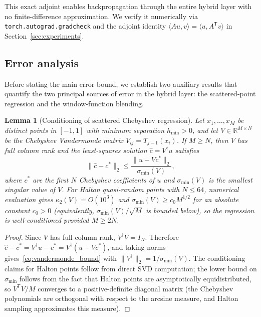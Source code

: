 \documentclass[sn-mathphys,Numbered]{sn-jnl}
\theoremstyle{thmstyleone}
\newtheorem{lemma}[theorem]{Lemma}
\theoremstyle{thmstyletwo}
\theoremstyle{thmstylethree}
\newcommand{\R}{\mathbb{R}}
\newcommand{\T}{\mathsf{T}}
\begin{document}
This exact adjoint enables backpropagation through the entire hybrid layer with no finite-difference approximation. We verify it numerically via \texttt{torch.autograd.gradcheck} and the adjoint identity $\langle A u, v \rangle = \langle u, A^\T v \rangle$ in Section~\ref{sec:experiments}.

\subsection{Error analysis}\label{subsec:error}

Before stating the main error bound, we establish two auxiliary results that quantify the two principal sources of error in the hybrid layer: the scattered-point regression and the window-function blending.

\begin{lemma}[Conditioning of scattered Chebyshev regression]\label{lem:vandermonde}
Let $x_1,\ldots,x_M$ be distinct points in $[-1,1]$ with minimum separation $h_{\min}>0$, and let $V\in\R^{M\times N}$ be the Chebyshev Vandermonde matrix $V_{ij}=T_{j-1}(x_i)$. If $M\geq N$, then $V$ has full column rank and the least-squares solution $\hat{c}=V^\dagger u$ satisfies
\begin{equation}
    \|\hat{c}-c^*\|_2 \leq \frac{\|u-Vc^*\|_2}{\sigma_{\min}(V)},
    \label{eq:vandermonde_bound}
\end{equation}
where $c^*$ are the first $N$ Chebyshev coefficients of $u$ and $\sigma_{\min}(V)$ is the smallest singular value of $V$. For Halton quasi-random points with $N\leq 64$, numerical evaluation gives $\kappa_2(V)=O(10^3)$ and $\sigma_{\min}(V)\geq c_0 M^{1/2}$ for an absolute constant $c_0>0$ (equivalently, $\sigma_{\min}(V)/\sqrt{M}$ is bounded below), so the regression is well-conditioned provided $M\geq 2N$.
\end{lemma}
\begin{proof}
Since $V$ has full column rank, $V^\dagger V=I_N$. Therefore $\hat{c}-c^*=V^\dagger u-c^*=V^\dagger(u-Vc^*)$, and taking norms gives~\eqref{eq:vandermonde_bound} with $\|V^\dagger\|_2=1/\sigma_{\min}(V)$. The conditioning claims for Halton points follow from direct SVD computation; the lower bound on $\sigma_{\min}$ follows from the fact that Halton points are asymptotically equidistributed, so $V^\T V/M$ converges to a positive-definite diagonal matrix (the Chebyshev polynomials are orthogonal with respect to the arcsine measure, and Halton sampling approximates this measure).
\end{proof}
\end{document}
